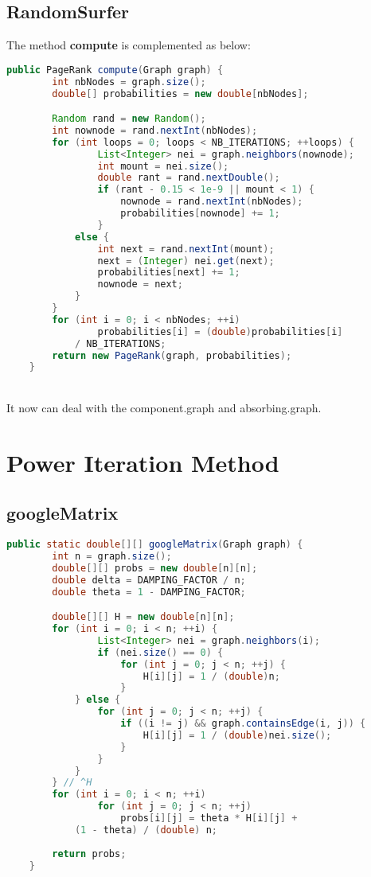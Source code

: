 \documentclass[11pt]{article} %
\begin{document}
\subsection{RandomSurfer}
The method \textbf{compute} is complemented as below:\\
\begin{lstlisting}[language=JAVA]
public PageRank compute(Graph graph) {
        int nbNodes = graph.size();
        double[] probabilities = new double[nbNodes];

        Random rand = new Random();
        int nownode = rand.nextInt(nbNodes);
        for (int loops = 0; loops < NB_ITERATIONS; ++loops) {
        		List<Integer> nei = graph.neighbors(nownode);
        		int mount = nei.size();
        		double rant = rand.nextDouble();
        		if (rant - 0.15 < 1e-9 || mount < 1) {
        			nownode = rand.nextInt(nbNodes);
        			probabilities[nownode] += 1;
        		}
        	else {
        		int next = rand.nextInt(mount);
        		next = (Integer) nei.get(next);
        		probabilities[next] += 1;
        		nownode = next;
        	}
        }
        for (int i = 0; i < nbNodes; ++i)
        		probabilities[i] = (double)probabilities[i]
			/ NB_ITERATIONS;
        return new PageRank(graph, probabilities);
    }
\end{lstlisting}
\\
It now can deal with the component.graph and absorbing.graph.

\section{Power Iteration Method}

\subsection{googleMatrix}

\begin{lstlisting}[language=JAVA]
public static double[][] googleMatrix(Graph graph) {
        int n = graph.size();
        double[][] probs = new double[n][n];
        double delta = DAMPING_FACTOR / n;
        double theta = 1 - DAMPING_FACTOR;

        double[][] H = new double[n][n];
        for (int i = 0; i < n; ++i) {
        		List<Integer> nei = graph.neighbors(i);
        		if (nei.size() == 0) {
        			for (int j = 0; j < n; ++j) {
        				H[i][j] = 1 / (double)n;
        			}
        	} else {
        		for (int j = 0; j < n; ++j) {
        			if ((i != j) && graph.containsEdge(i, j)) {
        				H[i][j] = 1 / (double)nei.size();
        			}
        		}
        	}
        } // ^H
        for (int i = 0; i < n; ++i)
        		for (int j = 0; j < n; ++j)
        			probs[i][j] = theta * H[i][j] +
			(1 - theta) / (double) n;
        
        return probs;
    }
\end{lstlisting}
\end{document}
